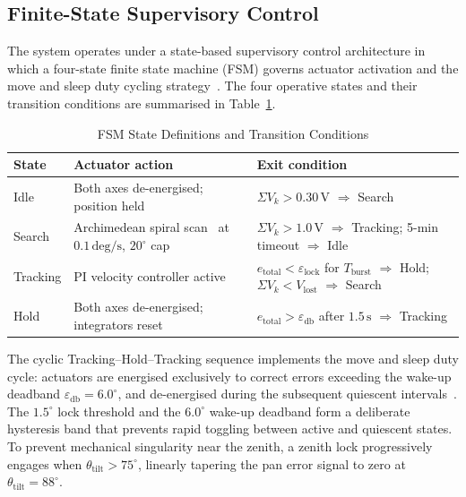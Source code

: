 \documentclass[preprint,3p,12pt]{elsarticle}
\newcommand{\degr}{^{\circ}}
\newcommand{\thetatilt}{\theta_{\mathrm{tilt}}}
\begin{document}
\subsection{Finite-State Supervisory Control}
\label{sec:fsm}
The system operates under a state-based supervisory control architecture in which a four-state finite state machine (FSM) governs actuator activation and the move and sleep duty cycling strategy~\cite{Rubio2007}. The four operative states and their transition conditions are summarised in Table~\ref{tab:fsm_states}.
\begin{table}[!ht]
\centering
\caption{FSM State Definitions and Transition Conditions}
\label{tab:fsm_states}
\renewcommand{\arraystretch}{1.25}
\begin{tabular}{@{}p{1.6cm}p{5.0cm}p{6.2cm}@{}}
\toprule
\textbf{State} & \textbf{Actuator action} & \textbf{Exit condition} \\
\midrule
Idle     & Both axes de-energised; position held &
    $\Sigma V_k > 0.30\,\mathrm{V}$ $\Rightarrow$ Search \\[2pt]
Search   & Archimedean spiral scan~\cite{Hafez2018} at
    $0.1\,\mathrm{deg/s}$, $20\degr$ cap &
    $\Sigma V_k > 1.0\,\mathrm{V}$ $\Rightarrow$ Tracking;
    5-min timeout $\Rightarrow$ Idle \\[2pt]
Tracking & PI velocity controller active &
    $e_{\mathrm{total}} < \varepsilon_{\mathrm{lock}}$ for $T_{\mathrm{burst}}$
    $\Rightarrow$ Hold;
    $\Sigma V_k < V_{\mathrm{lost}}$ $\Rightarrow$ Search \\[2pt]
Hold     & Both axes de-energised; integrators reset~\cite{Ogata2010} &
    $e_{\mathrm{total}} > \varepsilon_{\mathrm{db}}$ after $1.5\,\mathrm{s}$
    $\Rightarrow$ Tracking \\
\bottomrule
\end{tabular}
\end{table}
The cyclic Tracking--Hold--Tracking sequence implements the move and sleep duty cycle: actuators are energised exclusively to correct errors exceeding the wake-up deadband $\varepsilon_{\mathrm{db}} = 6.0\degr$, and de-energised during the subsequent quiescent intervals~\cite{Rubio2007, Tan2021}. The $1.5\degr$ lock threshold and the $6.0\degr$ wake-up deadband form a deliberate hysteresis band that prevents rapid toggling between active and quiescent states. To prevent mechanical singularity near the zenith, a zenith lock progressively engages when $\thetatilt > 75\degr$, linearly tapering the pan error signal to zero at $\thetatilt = 88\degr$.
\end{document}
